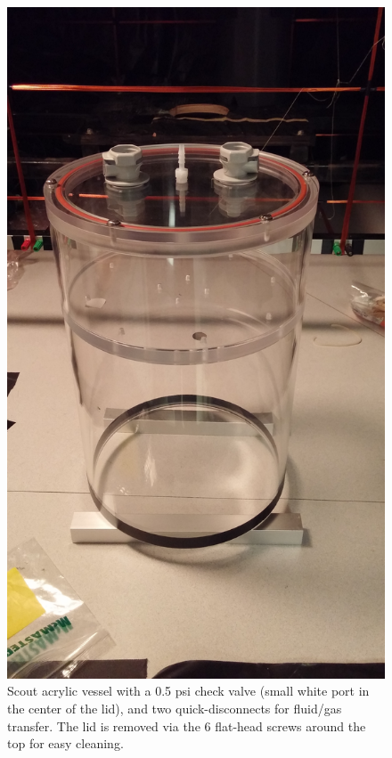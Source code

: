 \documentclass[]{article}
\begin{document}
\begin{figure}
  \centering
  \includegraphics[width=\textwidth, angle=270]{real_scout.jpg}
  \caption{Scout acrylic vessel with a 0.5 psi check valve (small white port in the center
  of the lid), and two quick-disconnects for fluid/gas transfer. The lid is removed via the
  6 flat-head screws around the top for easy cleaning.}
\end{figure}
\end{document}
